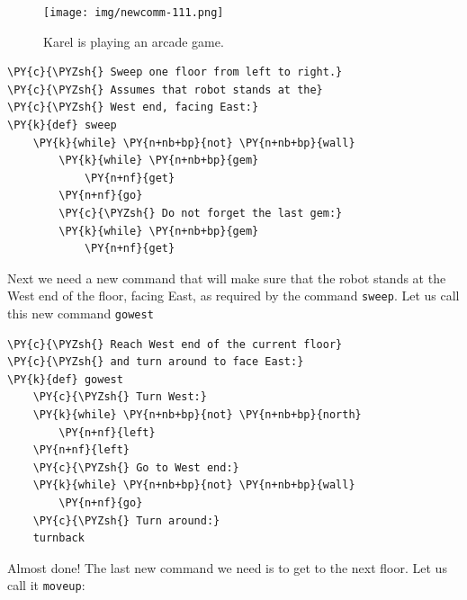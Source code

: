 \begin{figure}[!ht]
\begin{center}
\texttt{[image: img/newcomm-111.png]}
\vspace{-0mm}
\caption{Karel is playing an arcade game.}
\label{fig:newcomm-111}
\vspace{-6mm}
\end{center}
\end{figure}

\begin{bbox}
\begin{Verbatim}[commandchars=\\\{\}]
\PY{c}{\PYZsh{} Sweep one floor from left to right.}
\PY{c}{\PYZsh{} Assumes that robot stands at the}
\PY{c}{\PYZsh{} West end, facing East:}
\PY{k}{def} sweep
    \PY{k}{while} \PY{n+nb+bp}{not} \PY{n+nb+bp}{wall}
        \PY{k}{while} \PY{n+nb+bp}{gem}
            \PY{n+nf}{get}
        \PY{n+nf}{go}
        \PY{c}{\PYZsh{} Do not forget the last gem:}
        \PY{k}{while} \PY{n+nb+bp}{gem}
            \PY{n+nf}{get}
\end{Verbatim}
\end{bbox}
\vspace{6mm}

\noindent
Next we need a new command that will make sure that the
robot stands at the West end of the floor, facing East, as required by 
the command {\tt sweep}. Let us call this new command {\tt gowest}\\

\begin{bbox}
\begin{Verbatim}[commandchars=\\\{\}]
\PY{c}{\PYZsh{} Reach West end of the current floor}
\PY{c}{\PYZsh{} and turn around to face East:}
\PY{k}{def} gowest
    \PY{c}{\PYZsh{} Turn West:}
    \PY{k}{while} \PY{n+nb+bp}{not} \PY{n+nb+bp}{north}
        \PY{n+nf}{left}
    \PY{n+nf}{left}
    \PY{c}{\PYZsh{} Go to West end:}
    \PY{k}{while} \PY{n+nb+bp}{not} \PY{n+nb+bp}{wall}
        \PY{n+nf}{go}
    \PY{c}{\PYZsh{} Turn around:}
    turnback
\end{Verbatim}
\end{bbox}
\vspace{6mm}

\noindent
Almost done! The last new command we need is to get to the next 
floor. Let us call it {\tt moveup}:\\


